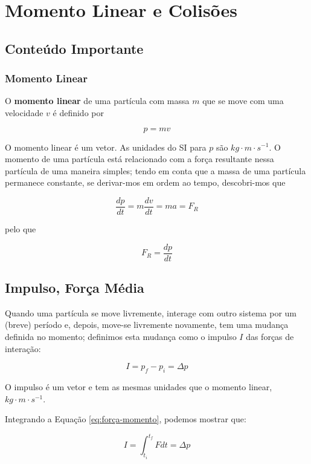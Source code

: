 \section{Momento Linear e Colisões}
\subsection{Conteúdo Importante}
\subsubsection{Momento Linear}

O \textbf{momento linear} de uma partícula com massa $m$ que se move com uma velocidade $v$ é definido por

\begin{equation}\label{eq:momento_linear}
    p=mv
\end{equation}

O momento linear é um vetor. As unidades do SI para $p$ são $kg\cdot m \cdot s^{-1}$.
O momento de uma partícula está relacionado com a força resultante nessa partícula de uma maneira simples; tendo em conta que a massa de uma partícula permanece constante, se derivar-mos em ordem ao tempo, descobri-mos que

$$
\frac{dp}{dt}=m\frac{dv}{dt}=ma=F_{R}
$$

pelo que

\begin{equation}\label{eq:força-momento}
    F_{R}=\frac{dp}{dt}
\end{equation}

\subsection{Impulso, Força Média}
Quando uma partícula se move livremente, interage com outro sistema por um (breve) período e, depois, move-se livremente novamente, tem uma mudança definida no momento; definimos esta mudança como o impulso $I$ das forças de interação:

\begin{equation}\label{eq:impulso}
    I=p_f-p_i=\Delta p
\end{equation}

O impulso é um vetor e tem as mesmas unidades que o momento linear, $kg\cdot m \cdot s^{-1}$.

Integrando a Equação \ref{eq:força-momento}, podemos mostrar que:

$$
I=\int_{t_i}^{t_f}Fdt=\Delta p
$$

